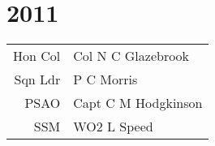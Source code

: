 \chapter*{2011}

\vspace*{20mm}

\begin{center}
  \begin{tabular}{rl}
    Hon Col & Col N C Glazebrook \\
    Sqn Ldr & P C Morris \\
    PSAO & Capt C M Hodgkinson \\
    SSM & WO2 L Speed \\
  \end{tabular}
\end{center}
